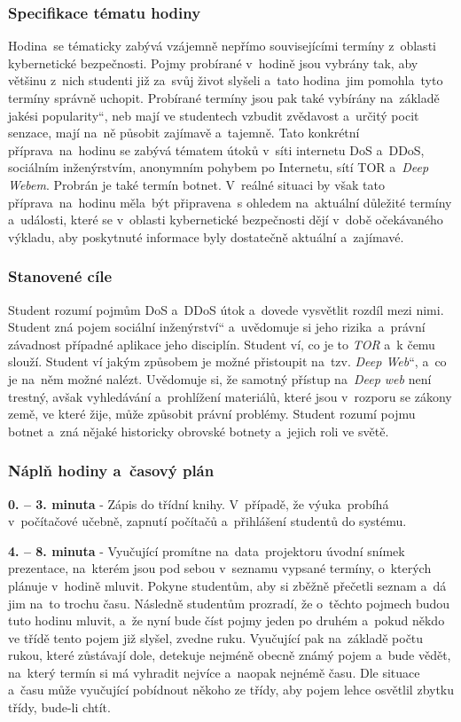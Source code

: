 \documentclass[a4paper, 12pt]{article}
\providecommand{\uv}[1]{\quotedblbase #1\textquotedblleft}
\begin{document}
\subsubsection{Specifikace tématu hodiny} 
Hodina~se tématicky zabývá vzájemně nepřímo souvisejícími termíny z~oblasti kybernetické bezpečnosti. Pojmy probírané v~hodině jsou vybrány tak, aby většinu z~nich studenti již za~svůj život slyšeli a~tato hodina~jim pomohla~tyto termíny správně uchopit. Probírané termíny jsou pak také vybírány na~základě jakési \uv{popularity}, neb mají ve studentech vzbudit zvědavost a~určitý pocit senzace, mají na~ně působit zajímavě a~tajemně. Tato konkrétní příprava~na~hodinu se zabývá tématem útoků v~síti internetu DoS a~DDoS, sociálním inženýrstvím, anonymním pohybem po Internetu, sítí TOR a~\textit{Deep Webem}. Probrán je také termín botnet. V~reálné situaci by však tato příprava~na~hodinu měla~být připravena~s ohledem na~aktuální důležité termíny a~události, které se v~oblasti kybernetické bezpečnosti dějí v~době očekávaného výkladu, aby poskytnuté informace byly dostatečně aktuální a~zajímavé.


\subsubsection{Stanovené cíle}
Student rozumí pojmům DoS a~DDoS útok a~dovede vysvětlit rozdíl mezi nimi. Student zná pojem \uv{sociální inženýrství} a~uvědomuje si jeho rizika~a~právní závadnost případné aplikace jeho disciplín. Student ví, co je to \textit{TOR} a~k čemu slouží. Student ví jakým způsobem je možné přistoupit na~tzv. \uv{\textit{Deep Web}}, a~co je na~něm možné nalézt. Uvědomuje si, že samotný přístup na~\textit{Deep web} není trestný, avšak vyhledávání a~prohlížení materiálů, které jsou v~rozporu se zákony země, ve které žije, může způsobit právní problémy. Student rozumí pojmu botnet a~zná nějaké historicky obrovské botnety a~jejich roli ve světě. 
 

\subsubsection{Náplň hodiny a~časový plán}
\indent\textbf{0. -- 3. minuta} - Zápis do třídní knihy. V~případě, že výuka~probíhá v~počítačové učebně, zapnutí počítačů a~přihlášení studentů do systému.

\textbf{4. -- 8. minuta} - Vyučující promítne na~data~projektoru úvodní snímek prezentace, na~kterém jsou pod sebou v~seznamu vypsané termíny, o~kterých plánuje v~hodině mluvit. Pokyne studentům, aby si zběžně přečetli seznam a~dá jim na~to trochu času. Následně studentům prozradí, že o~těchto pojmech budou tuto hodinu mluvit, a~že nyní bude číst pojmy jeden po druhém a~pokud někdo ve třídě tento pojem již slyšel, zvedne ruku. Vyučující pak na~základě počtu rukou, které zůstávají dole, detekuje nejméně obecně známý pojem a~bude vědět, na~který termín si má vyhradit nejvíce a~naopak nejnémě času. Dle situace a~času může vyučující pobídnout někoho ze třídy, aby pojem lehce osvětlil zbytku třídy, bude-li chtít.
\end{document}
